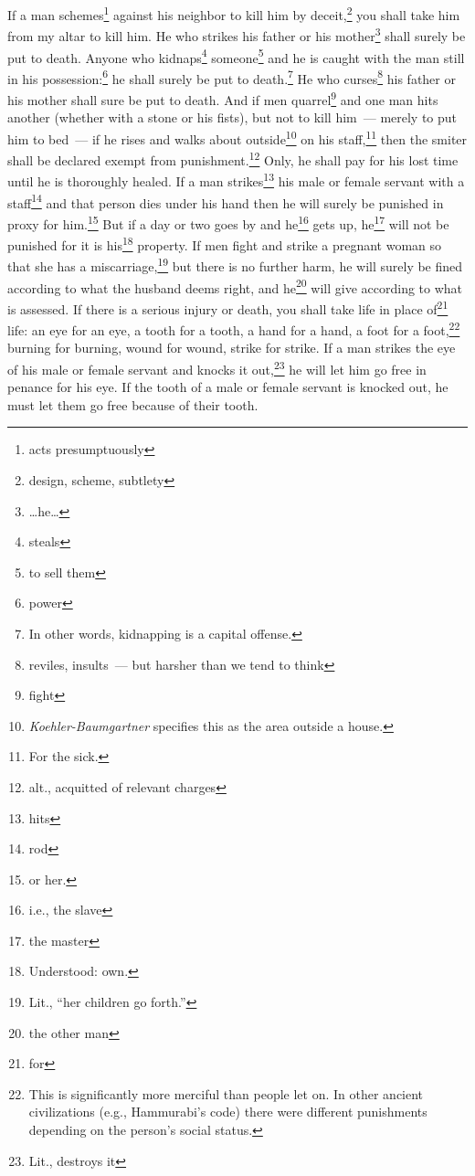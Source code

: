 \begin{enumerate*}[mode=unboxed]
     If a man schemes\footnote{acts presumptuously} against his neighbor to kill him by deceit,\footnote{design, scheme, subtlety} you shall take him from my altar to kill him.%
     He who strikes his father or his mother\footnote{\dots he\dots} shall surely be put to death.%
     Anyone who kidnaps\footnote{steals} someone\footnote{to sell them} and he is caught with the man still in his possession:\footnote{power} he shall surely be put to death.\footnote{In other words, kidnapping is a capital offense.}%
     He who curses\footnote{reviles, insults~--- but harsher than we tend to think} his father or his mother shall sure be put to death.%
     And if men quarrel\footnote{fight} and one man hits another (whether with a stone or his fists), but not to kill him~--- merely to put him to bed~---%
     if he rises and walks about outside\footnote{\textit{Koehler-Baumgartner} specifies this as the area outside a house.} on his staff,\footnote{For the sick.} then the smiter shall be declared exempt from punishment.\footnote{alt., acquitted of relevant charges} Only, he shall pay for his lost time until he is thoroughly healed.%
     If a man strikes\footnote{hits} his male or female servant with a staff\footnote{rod} and that person dies under his hand then he will surely be punished in proxy for him.\footnote{or her.}%
     But if a day or two goes by and he\footnote{i.e., the slave} gets up, he\footnote{the master} will not be punished for it is his\footnote{Understood: own.} property.%
     If men fight and strike a pregnant woman so that she has a miscarriage,\footnote{Lit., ``her children go forth.''} but there is no further harm, he will surely be fined according to what the husband deems right, and he\footnote{the other man} will give according to what is assessed.%
     If there is a serious injury or death, you shall take life in place of\footnote{for} life:%
     an eye for an eye, a tooth for a tooth, a hand for a hand, a foot for a foot,\footnote{This is significantly more merciful than people let on. In other ancient civilizations (e.g., Hammurabi's code) there were different punishments depending on the person's social status.}%
     burning for burning, wound for wound, strike for strike.%
     If a man strikes the eye of his male or female servant and knocks it out,\footnote{Lit., destroys it} he will let him go free in penance for his eye.%
     If the tooth of a male or female servant is knocked out, he must let them go free because of their tooth.%

\end{enumerate*}
